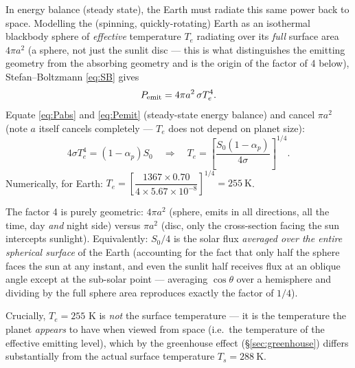 \documentclass[11pt]{article}
\begin{document}
In energy balance (steady state), the Earth must radiate this same power back to space. Modelling the (spinning, quickly-rotating) Earth as an isothermal blackbody sphere of \emph{effective} temperature $T_e$ radiating over its \emph{full} surface area $4\pi a^2$ (a sphere, not just the sunlit disc — this is what distinguishes the emitting geometry from the absorbing geometry and is the origin of the factor of 4 below), Stefan--Boltzmann \eqref{eq:SB} gives
\begin{equation}
P_{\rm emit} = 4\pi a^2\,\sigma T_e^4.
\label{eq:Pemit}
\end{equation}
Equate \eqref{eq:Pabs} and \eqref{eq:Pemit} (steady-state energy balance) and cancel $\pi a^2$ (note $a$ itself cancels completely — $T_e$ does not depend on planet size):
\begin{equation}
4\sigma T_e^4 = (1-\alpha_p)S_0 \quad\Longrightarrow\quad \boxed{T_e = \left[\frac{S_0(1-\alpha_p)}{4\sigma}\right]^{1/4}}.
\label{eq:Te}
\end{equation}
Numerically, for Earth: $T_e = \left[\dfrac{1367\times0.70}{4\times5.67\times10^{-8}}\right]^{1/4} = 255\ \text{K}$.

\begin{intuition}
The factor 4 is purely geometric: $4\pi a^2$ (sphere, emits in all directions, all the time, day \emph{and} night side) versus $\pi a^2$ (disc, only the cross-section facing the sun intercepts sunlight). Equivalently: $S_0/4$ is the solar flux \emph{averaged over the entire spherical surface} of the Earth (accounting for the fact that only half the sphere faces the sun at any instant, and even the sunlit half receives flux at an oblique angle except at the sub-solar point — averaging $\cos\theta$ over a hemisphere and dividing by the full sphere area reproduces exactly the factor of $1/4$).
\end{intuition}

Crucially, $T_e=255$ K is \emph{not} the surface temperature — it is the temperature the planet \emph{appears} to have when viewed from space (i.e.\ the temperature of the effective emitting level), which by the greenhouse effect (\S\ref{sec:greenhouse}) differs substantially from the actual surface temperature $T_s=288\ \text{K}$.
\end{document}
